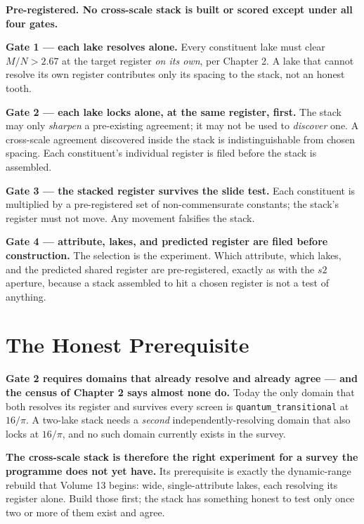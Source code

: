 \documentclass[11pt, letterpaper, openany]{book}
\newcommand{\MN}{M/N}
\begin{document}
\begin{predictionbox}
\textbf{Pre-registered. No cross-scale stack is built or scored except under all four gates.}

\medskip
\textbf{Gate 1 --- each lake resolves alone.} Every constituent lake must clear
$\MN > 2.67$ at the target register \emph{on its own}, per Chapter 2. A lake that cannot resolve its
own register contributes only its spacing to the stack, not an honest tooth.

\medskip
\textbf{Gate 2 --- each lake locks alone, at the same register, first.} The stack may only
\emph{sharpen} a pre-existing agreement; it may not be used to \emph{discover} one. A cross-scale
agreement discovered inside the stack is indistinguishable from chosen spacing. Each constituent's
individual register is filed before the stack is assembled.

\medskip
\textbf{Gate 3 --- the stacked register survives the slide test.} Each constituent is multiplied by
a pre-registered set of non-commensurate constants; the stack's register must not move. Any movement
falsifies the stack.

\medskip
\textbf{Gate 4 --- attribute, lakes, and predicted register are filed before construction.} The
selection is the experiment. Which attribute, which lakes, and the predicted shared register are
pre-registered, exactly as with the $s2$ aperture, because a stack assembled to hit a chosen
register is not a test of anything.
\end{predictionbox}

\section{The Honest Prerequisite}

\begin{warningbox}
\textbf{Gate 2 requires domains that already resolve and already agree --- and the census of
Chapter 2 says almost none do.} Today the only domain that both resolves its register and survives
every screen is \texttt{quantum\_transitional} at $16/\pi$. A two-lake stack needs a \emph{second}
independently-resolving domain that also locks at $16/\pi$, and no such domain currently exists in
the survey.

\medskip
\noindent \textbf{The cross-scale stack is therefore the right experiment for a survey the
programme does not yet have.} Its prerequisite is exactly the dynamic-range rebuild that Volume 13
begins: wide, single-attribute lakes, each resolving its register alone. Build those first; the
stack has something honest to test only once two or more of them exist and agree.
\end{warningbox}
\end{document}
